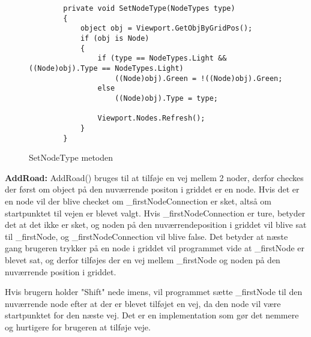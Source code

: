 \begin{figure}[H]
\begin{lstlisting}
        private void SetNodeType(NodeTypes type)
        {
            object obj = Viewport.GetObjByGridPos();
            if (obj is Node)
            {
                if (type == NodeTypes.Light && ((Node)obj).Type == NodeTypes.Light)
                    ((Node)obj).Green = !((Node)obj).Green;
                else
                    ((Node)obj).Type = type;

                Viewport.Nodes.Refresh();
            }
        }
\end{lstlisting}
\caption{SetNodeType metoden}\label{SetNodeTypeCode}
\end{figure}

\vspace{5mm}


\textbf{AddRoad:} \newline
AddRoad() bruges til at tilføje en vej mellem 2 noder, derfor checkes der først om object på den nuværrende positon i griddet er en node. Hvis det er en node vil der blive checket om \_firstNodeConnection er sket, altså om startpunktet til vejen er blevet valgt. Hvis \_firstNodeConnection er ture, betyder det at det ikke er sket, og noden på den nuværrendeposition i griddet vil blive sat til \_firstNode, og \_firstNodeConnection vil blive false. Det betyder at næste gang brugeren trykker på en node i griddet vil programmet vide at \_firstNode er blevet sat, og derfor tilføjes der en vej mellem \_firstNode og noden på den nuværrende position i griddet.

Hvis brugern holder "Shift" nede imens, vil programmet sætte \_firstNode til den nuværrende node efter at der er blevet tilføjet en vej, da den node vil være startpunktet for den næste vej. Det er en implementation som gør det nemmere og hurtigere for brugeren at tilføje veje. 


